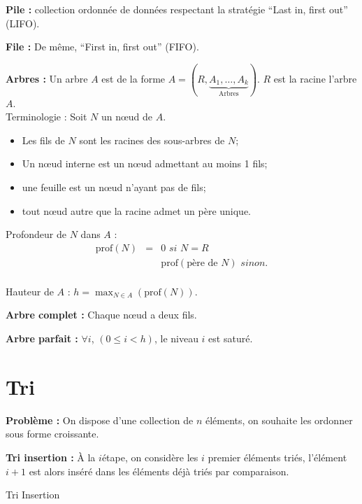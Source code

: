 \documentclass[a4paper, 8pt]{article}
\begin{document}
\begin{multicols*}{3}
\textbf{Pile :} collection ordonnée de données respectant la stratégie \enquote{Last in, first out} (LIFO).

\textbf{File :} De même, \enquote{First in, first out} (FIFO).

\textbf{Arbres :} Un arbre $A$ est de la forme $A = (R, \underbrace{A_1, \ldots, A_k}_{\text{Arbres}})$. $R$ est la racine l'arbre $A$.\\
Terminologie : Soit $N$ un nœud de $A$.
\begin{itemize}
\item Les fils de $N$ sont les racines des sous-arbres de $N$;
\item Un nœud interne est un nœud admettant au moins 1 fils;
\item une feuille est un nœud n'ayant pas de fils;
\item tout nœud autre que la racine admet un père unique.
\end{itemize}

Profondeur de $N$ dans $A$ :
\[
\begin{array}{rc|l}
\text{prof}(N) & = & 0 \textit{ si } N=R  \\
 & & \text{prof}(\text{père de }N) \textit{ sinon.}  \\
\end{array}
\]

Hauteur de $A$ : $h = \displaystyle \max_{N\in A}\left(\text{prof}(N)\right).$

\textbf{Arbre complet :} Chaque nœud a deux fils.

\textbf{Arbre parfait :} $\forall i$, $(0 \leqslant i < h)$, le niveau $i$ est saturé.

\section*{Tri}

\textbf{Problème :} On dispose d'une collection de $n$ éléments, on souhaite les ordonner sous forme croissante.

\textbf{Tri insertion :} \`{A} la $i$\ieme étape, on considère les $i$ premier éléments triés, l'élément $i+1$ est alors inséré dans les éléments déjà triés par comparaison.
\begin{algorithm}[H]
 \caption{Tri Insertion}
\end{algorithm}


\end{multicols*}
\end{document}
